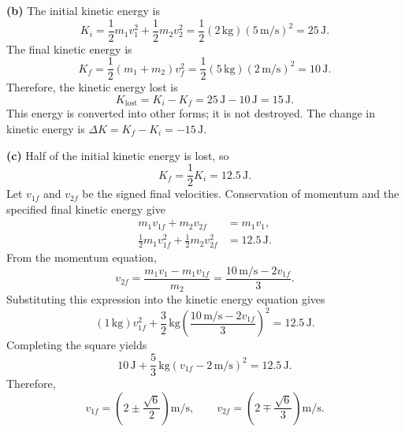 \documentclass[12pt]{article}
\begin{document}
\textbf{(b)}
The initial kinetic energy is
\begin{equation}
    K_i = \frac{1}{2}m_1v_1^2+\frac{1}{2}m_2v_2^2
    = \frac{1}{2}(2\,\mathrm{kg})(5\,\mathrm{m/s})^2
    = 25\,\mathrm{J}.
\end{equation}
The final kinetic energy is
\begin{equation}
    K_f = \frac{1}{2}(m_1+m_2)v_f^2
    = \frac{1}{2}(5\,\mathrm{kg})(2\,\mathrm{m/s})^2
    = 10\,\mathrm{J}.
\end{equation}
Therefore, the kinetic energy lost is
\begin{equation}
    K_{\mathrm{lost}} = K_i-K_f
    = 25\,\mathrm{J}-10\,\mathrm{J}
    = \boxed{15\,\mathrm{J}}.
\end{equation}
This energy is converted into other forms; it is not destroyed.
The change in kinetic energy is
$\Delta K = K_f-K_i=-15\,\mathrm{J}$.

\textbf{(c)}
Half of the initial kinetic energy is lost, so
\begin{equation}
    K_f = \frac{1}{2}K_i = 12.5\,\mathrm{J}.
\end{equation}
Let $v_{1f}$ and $v_{2f}$ be the signed final velocities.
Conservation of momentum and the specified final kinetic energy give
\begin{align}
    m_1v_{1f}+m_2v_{2f} &= m_1v_1,\\
    \frac{1}{2}m_1v_{1f}^2+\frac{1}{2}m_2v_{2f}^2
    &= 12.5\,\mathrm{J}.
\end{align}
From the momentum equation,
\begin{equation}
    v_{2f}
    = \frac{m_1v_1-m_1v_{1f}}{m_2}
    = \frac{10\,\mathrm{m/s}-2v_{1f}}{3}.
\end{equation}
Substituting this expression into the kinetic energy equation gives
\begin{equation}
    (1\,\mathrm{kg})v_{1f}^2
    + \frac{3}{2}\,\mathrm{kg}
    \left(\frac{10\,\mathrm{m/s}-2v_{1f}}{3}\right)^2
    = 12.5\,\mathrm{J}.
\end{equation}
Completing the square yields
\begin{equation}
    10\,\mathrm{J}
    + \frac{5}{3}\,\mathrm{kg}
    \left(v_{1f}-2\,\mathrm{m/s}\right)^2
    = 12.5\,\mathrm{J}.
\end{equation}
Therefore,
\begin{equation}
    v_{1f}
    = \left(2\pm\frac{\sqrt{6}}{2}\right)\mathrm{m/s},
    \qquad
    v_{2f}
    = \left(2\mp\frac{\sqrt{6}}{3}\right)\mathrm{m/s}.
\end{equation}
\end{document}
